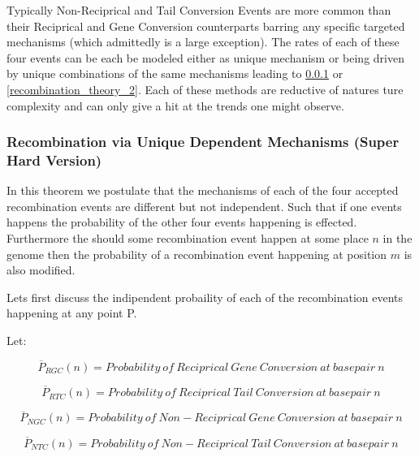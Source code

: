 \documentclass{article}
\begin{document}
    Typically Non-Reciprical and Tail Conversion Events are more common than their Reciprical and Gene Conversion counterparts barring any specific targeted mechanisms (which admittedly is a large exception).  The rates of each of these four events can be each be modeled either as unique mechanism or being driven by unique combinations of the same mechanisms leading to \ref{recombination_theory_1} or \ref{recombination_theory_2}.  Each of these methods are reductive of natures ture complexity and can only give a hit at the trends one might observe.

    \subsubsection{Recombination via Unique Dependent Mechanisms (Super Hard Version)}\label{recombination_theory_1} 

        In this theorem we postulate that the mechanisms of each of the four accepted recombination events are different but not independent.  Such that if one events happens the probability of the other four events happening is effected.  Furthermore the should some recombination event happen at some place \(n\) in the genome then the probability of a recombination event happening at position \(m\) is also modified.

        Lets first discuss the indipendent probaility of each of the recombination events happening at any point P.

        Let:

        \begin{equation}
            \overline{P}_{RGC}(n) = Probability\ of\ Reciprical\ Gene\ Conversion\ at\ basepair\ n
        \end{equation}

        \begin{equation}
            \overline{P}_{RTC}(n) = Probability\ of\ Reciprical\ Tail\ Conversion\ at\ basepair\ n
        \end{equation}

        \begin{equation}
            \overline{P}_{NGC}(n) = Probability\ of\ Non-Reciprical\ Gene\ Conversion\ at\ basepair\ n
        \end{equation}

        \begin{equation}
            \overline{P}_{NTC}(n) = Probability\ of\ Non-Reciprical\ Tail\ Conversion\ at\ basepair\ n
        \end{equation}
\end{document}
